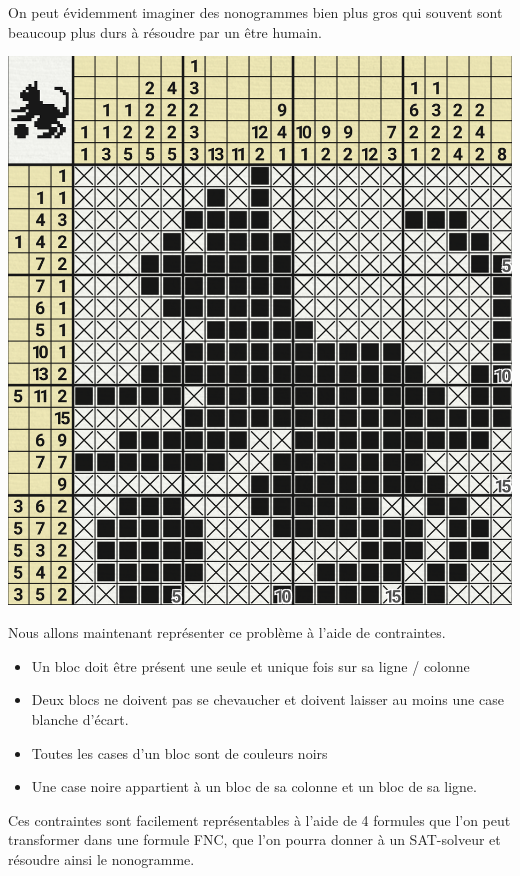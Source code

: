 \documentclass[12pt]{extarticle}
\begin{document}
\vspace{2em}

On peut évidemment imaginer des nonogrammes bien plus gros qui souvent sont beaucoup plus durs à résoudre par un être humain.

\vspace{2em}

\begin{center}
\includegraphics[width=.75\textwidth,height=.75\textwidth]{cat_picross.png}
\end{center}

\vspace{2em}

Nous allons maintenant représenter ce problème à l'aide de contraintes.

\begin{itemize}
    \item Un bloc doit être présent une seule et unique fois sur sa ligne / colonne
    \item Deux blocs ne doivent pas se chevaucher 
    et doivent laisser au moins une case blanche d'écart.
    \item Toutes les cases d'un bloc sont de couleurs noirs
    \item Une case noire appartient à un bloc de sa colonne et un bloc de sa ligne.
\end{itemize}

Ces contraintes sont facilement représentables à l'aide de 4 formules que l'on peut transformer dans une formule FNC, que l'on pourra donner à un SAT-solveur et résoudre ainsi le nonogramme.
\end{document}
